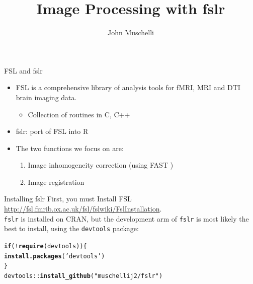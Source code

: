 \documentclass[11pt]{beamer}\usepackage[]{graphicx}\usepackage[]{color}
\author{John Muschelli}
\title{Image Processing with fslr}
\institute{Johns Hopkins Bloomberg School of Public Health}
\makeatletter
\newcommand{\hlstr}[1]{\textcolor[rgb]{0.192,0.494,0.8}{#1}}%
\newcommand{\hlopt}[1]{\textcolor[rgb]{0,0,0}{#1}}%
\newcommand{\hlstd}[1]{\textcolor[rgb]{0.345,0.345,0.345}{#1}}%
\newcommand{\hlkwa}[1]{\textcolor[rgb]{0.161,0.373,0.58}{\textbf{#1}}}%
\newcommand{\hlkwd}[1]{\textcolor[rgb]{0.737,0.353,0.396}{\textbf{#1}}}%
\newenvironment{kframe}{%
 \def\at@end@of@kframe{}%
 \ifinner\ifhmode%
  \def\at@end@of@kframe{\end{minipage}}%
  \begin{minipage}{\columnwidth}%
 \fi\fi%
 \def\FrameCommand##1{\hskip\@totalleftmargin \hskip-\fboxsep
 \colorbox{shadecolor}{##1}\hskip-\fboxsep
     \hskip-\linewidth \hskip-\@totalleftmargin \hskip\columnwidth}%
 \MakeFramed {\advance\hsize-\width
   \@totalleftmargin\z@ \linewidth\hsize
   \@setminipage}}%
 {\par\unskip\endMakeFramed%
 \at@end@of@kframe}
\newenvironment{knitrout}{}{} %
\makeatother
\begin{document}
\begin{frame}
\titlepage
\end{frame}





\begin{frame}[fragile]{FSL and fslr}

\begin{itemize}
\item FSL is a comprehensive library of analysis tools for fMRI, MRI and DTI brain imaging data. 
\begin{itemize}
\item Collection of routines in C, C++
\end{itemize}
\item fslr: port of FSL into R
\item The two functions we focus on are: 
\begin{enumerate}
\item Image inhomogeneity correction (using FAST \citep{zhang2001segmentation})
\item Image registration
\end{enumerate} 
\end{itemize}

\end{frame}


\begin{frame}[fragile]{Installing fslr}
First, you must Install FSL \href{http://fsl.fmrib.ox.ac.uk/fsl/fslwiki/FslInstallation}{http://fsl.fmrib.ox.ac.uk/fsl/fslwiki/FslInstallation}.  \\
\vspace{0.5cm}
\verb|fslr| is installed on CRAN, but the development arm of \verb|fslr| is most likely the best to install, using the \verb|devtools| package:

\begin{knitrout}
\color{fgcolor}\begin{kframe}
\begin{alltt}
\hlkwa{if} \hlstd{(}\hlopt{!}\hlkwd{require}\hlstd{(devtools))\{}
  \hlkwd{install.packages}\hlstd{(}\hlstr{'devtools'}\hlstd{)}
\hlstd{\}}
\hlstd{devtools}\hlopt{::}\hlkwd{install_github}\hlstd{(}\hlstr{"muschellij2/fslr"}\hlstd{)}
\end{alltt}
\end{kframe}
\end{knitrout}
\end{frame}
\end{document}
